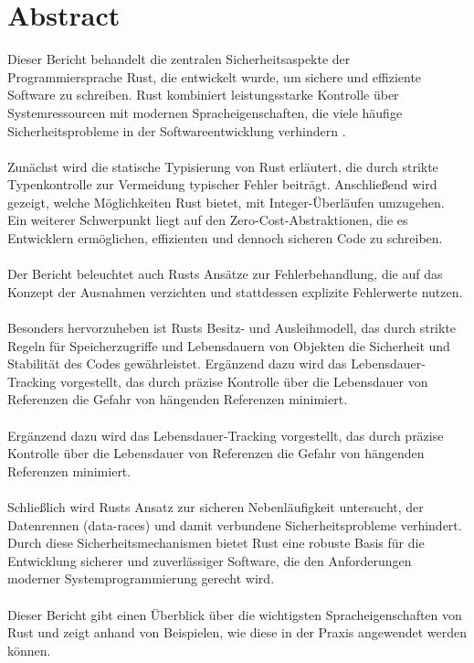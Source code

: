 \section*{Abstract}
\label{sec:abstract}

Dieser Bericht behandelt die zentralen Sicherheitsaspekte der Programmiersprache Rust, die entwickelt wurde, um sichere und effiziente Software zu schreiben. 
Rust kombiniert leistungsstarke Kontrolle über Systemressourcen mit modernen Spracheigenschaften, die viele häufige Sicherheitsprobleme in der Softwareentwicklung verhindern \cite{RustDoc2024}.\\
\\
Zunächst wird die statische Typisierung von Rust erläutert, die durch strikte Typenkontrolle zur Vermeidung typischer Fehler beiträgt. 
Anschließend wird gezeigt, welche Möglichkeiten Rust bietet, mit Integer-Überläufen umzugehen. 
Ein weiterer Schwerpunkt liegt auf den Zero-Cost-Abstraktionen, die es Entwicklern ermöglichen, effizienten und dennoch sicheren Code zu schreiben.\\
\\
Der Bericht beleuchtet auch Rusts Ansätze zur Fehlerbehandlung, die auf das Konzept der Ausnahmen verzichten und stattdessen explizite Fehlerwerte nutzen.\\
\\
Besonders hervorzuheben ist Rusts Besitz- und Ausleihmodell, das durch strikte Regeln für Speicherzugriffe und Lebensdauern von Objekten die Sicherheit und Stabilität des Codes gewährleistet. Ergänzend dazu wird das Lebensdauer-Tracking vorgestellt, das durch präzise Kontrolle über die Lebensdauer von Referenzen die Gefahr von hängenden Referenzen minimiert.\\
\\
Ergänzend dazu wird das Lebensdauer-Tracking vorgestellt, das durch präzise Kontrolle über die Lebensdauer von Referenzen die Gefahr von hängenden Referenzen minimiert.\\
\\
Schließlich wird Rusts Ansatz zur sicheren Nebenläufigkeit untersucht, der Datenrennen (\glspl{data-race}) und damit verbundene Sicherheitsprobleme verhindert. 
Durch diese Sicherheitsmechanismen bietet Rust eine robuste Basis für die Entwicklung sicherer und zuverlässiger Software, die den Anforderungen moderner Systemprogrammierung gerecht wird.\\
\\
Dieser Bericht gibt einen Überblick über die wichtigsten Spracheigenschaften von Rust und zeigt anhand von Beispielen, wie diese in der Praxis angewendet werden können.
